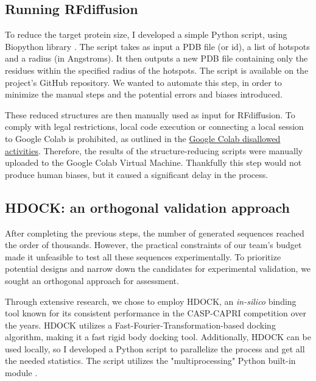 \documentclass[11pt,a4paper]{article}
\begin{document}
\subsection{Running RFdiffusion}

To reduce the target protein size, I developed a simple Python script, using Biopython library \cite{biopython}. The script takes as input a PDB file (or id), a list of hotspots and a radius (in Angstroms). It then outputs a new PDB file containing only the residues within the specified radius of the hotspots. The script is available on the project's GitHub repository. We wanted to automate this step, in order to minimize the manual steps and the potential errors and biases introduced.

These reduced structures are then manually used as input for RFdiffusion. To comply with legal restrictions, local code execution or connecting a local session to Google Colab is prohibited, as outlined in the \href{https://research.google.com/colaboratory/faq.html#disallowed-activities}{Google Colab disallowed activities}. Therefore, the results of the structure-reducing scripts were manually uploaded to the Google Colab Virtual Machine. Thankfully this step would not produce human biases, but it caused a significant delay in the process.

\subsection{HDOCK: an orthogonal validation approach}

After completing the previous steps, the number of generated sequences reached the order of thousands. However, the practical constraints of our team's budget made it unfeasible to test all these sequences experimentally. To prioritize potential designs and narrow down the candidates for experimental validation, we sought an orthogonal approach for assessment.

Through extensive research, we chose to employ HDOCK, an \emph{in-silico} binding tool \cite{yan2017hdock} known for its consistent performance in the CASP-CAPRI \cite{casp-capri} competition over the years. HDOCK utilizes a Fast-Fourier-Transformation-based docking algorithm, making it a fast rigid body docking tool. Additionally, HDOCK can be used locally, so I developed a Python script to parallelize the process and get all the needed statistics. The script utilizes the "multiprocessing" Python built-in module \cite{python_multiprocessing}.
\end{document}
